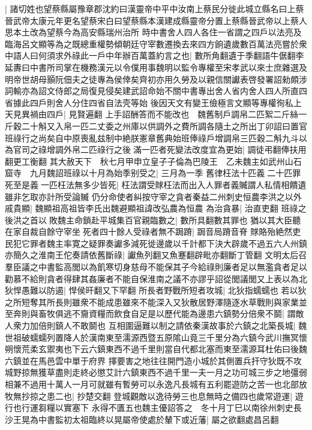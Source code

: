 |{
	諸切姓也望蔡縣屬豫章郡沈約曰漢靈帝中平中汝南上蔡民分徙此城立縣名曰上蔡晉武帝太康元年更名望蔡宋白曰望蔡縣本漢建成縣靈帝分置上蔡縣晉武帝以上蔡人思本土改為望蔡今為高安縣瑞州治所}
時中書舍人四人各住一省謂之四戶以法亮及臨海呂文顯等為之既總重權勢傾朝廷守宰數遷換去來四方餉遺歲數百萬法亮嘗於衆中語人曰何須求外祿此一戶中年辦百萬蓋約言之也|{
	數所角翻遺于季翻語牛倨翻李延夀曰中書所司掌在機務漢元以令僕用事魏明以監令專權至宋孝武以來士庶雜選及明帝世胡母顥阮佃夫之徒專為侯倖矣齊初亦用久勞及以親信關讞表啓發署詔勑頗涉詞輸亦為詔文侍郎之局復見侵矣建武詔命始不關中書專出舍人省内舍人四人所直四省據此四戶則舍人分住四省自法壳等始}
後因天文有變王儉極言文顯等專權徇私上天見異禍由四戶|{
	見賢遍翻}
上手詔酬答而不能改也　魏舊制戶調帛二匹絮二斤絲一斤穀二十斛又入帛一匹二丈委之州庫以供調外之費所調各隨土之所出丁卯詔曰置官班祿行之尚矣自中原喪亂兹制中絶朕憲章舊典始班俸祿戶增調帛三匹穀二斛九斗以為官司之祿增調外帛二匹祿行之後滿一匹者死變法改度宜為更始|{
	調徒弔翻俸扶用翻更工衡翻}
其大赦天下　秋七月甲申立皇子子倫為巴陵王　乙未魏主如武州山石窟寺　九月魏詔班祿以十月為始季别受之|{
	三月為一季}
舊律枉法十匹義二十匹罪死至是義一匹枉法無多少皆死|{
	枉法謂受賕枉法而出入人罪者義贓謂人私情相饋遺雖非乞取亦計所受論贓}
仍分命使者糾按守宰之貪者秦益二州刺史恒農李洪之以外戚貴顯|{
	魏顯祖高祖皆李氏出魏避顯祖諱改弘農為恒農}
為治貪暴|{
	治直吏翻}
班祿之後洪之首以敗魏主命鎖赴平城集百官親臨數之|{
	數所具翻數其罪也}
猶以其大臣聽在家自裁自餘守宰坐死者四十餘人受祿者無不跼蹐|{
	跼音局蹐音脊}
賕賂殆絶然吏民犯它罪者魏主率寛之疑罪奏讞多減死徙邊歲以千計都下決大辟歲不過五六人州鎮亦簡久之淮南王佗奏請依舊斷祿|{
	讞魚列翻又魚蹇翻辟毗亦翻斷丁管翻}
文明太后召羣臣議之中書監高閭以為飢寒切身慈母不能保其子今給祿則廉者足以無濫貪者足以勸慕不給則貪者得肆其姦廉者不能自保淮南之議不亦謬乎詔從閭議閭又上表以為北狄悍愚難以防遏|{
	悍侯旰翻又下罕翻}
所長者野戰所短者攻城|{
	北狄指蠕蠕也}
若以狄之所短奪其所長則雖衆不能成患雖來不能深入又狄散居野澤隨逐水草戰則與家業並至奔則與畜牧俱逃不齎資糧而飲食自足是以歷代能為邊患六鎮勢分倍衆不鬬|{
	謂敵人衆力加倍則鎮人不敢鬬也}
互相圍逼難以制之請依秦漢故事於六鎮之北築長城|{
	魏世祖破蠕蠕列置降人於漢南東至濡源西暨五原隂山竟三千里分為六鎮今武川撫冥懷朔懷荒柔玄禦夷也下云六鎮東西不過千里則當自代都北塞而東至濡源耳杜佑曰後魏六鎮並在馬邑雲中單于府界}
擇要害之地往往開門造小城於其側置兵扞守狄既不攻城野掠無獲草盡則走終必懲艾計六鎮東西不過千里一夫一月之功可城三步之地彊弱相兼不過用十萬人一月可就雖有暫勞可以永逸凡長城有五利罷遊防之苦一也北部放牧無抄掠之患二也|{
	抄楚交翻}
登城觀敵以逸待勞三也息無時之備四也歲常遊運|{
	遊行也行運芻糧以實塞下}
永得不匱五也魏主優詔答之　冬十月丁巳以南徐州刺史長沙王晃為中書監初太祖臨終以晃屬帝使處於輦下或近藩|{
	屬之欲翻處昌呂翻}

